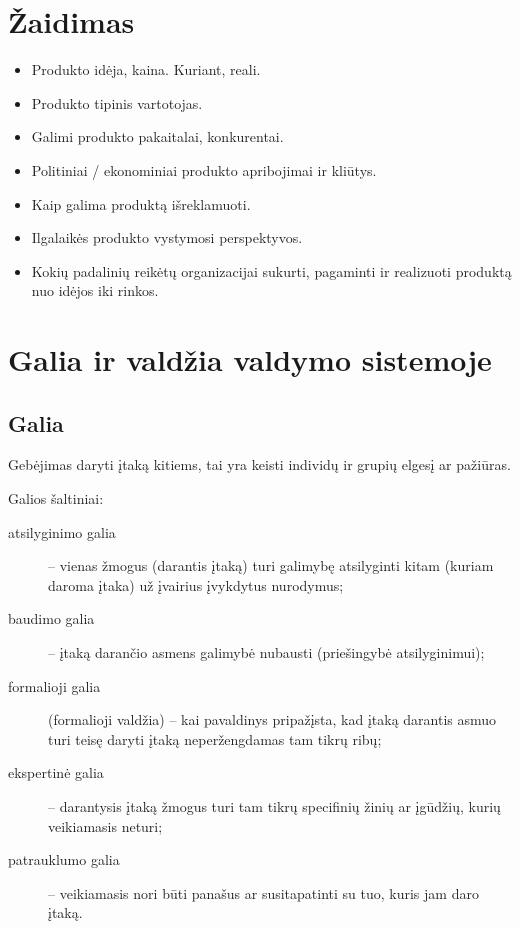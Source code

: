 \chapter{Žaidimas}

\begin{itemize}
  \item Produkto idėja, kaina. Kuriant, reali.
  \item Produkto tipinis vartotojas.
  \item Galimi produkto pakaitalai, konkurentai.
  \item Politiniai / ekonominiai produkto apribojimai ir kliūtys.
  \item Kaip galima produktą išreklamuoti.
  \item Ilgalaikės produkto vystymosi perspektyvos.
  \item Kokių padalinių reikėtų organizacijai sukurti, pagaminti ir 
    realizuoti produktą nuo idėjos iki rinkos.
\end{itemize}

\chapter{Galia ir valdžia valdymo sistemoje}

\section{Galia}

\begin{defn}[Galia]
  Gebėjimas daryti įtaką kitiems, tai yra keisti individų ir grupių
  elgesį ar pažiūras.
\end{defn}

Galios šaltiniai:
\begin{description}
  \item[atsilyginimo galia] – vienas žmogus (darantis įtaką) turi
    galimybę atsilyginti kitam (kuriam daroma įtaka) už įvairius
    įvykdytus nurodymus;
  \item[baudimo galia] – įtaką darančio asmens galimybė nubausti
    (priešingybė atsilyginimui);
  \item[formalioji galia] (formalioji valdžia) – kai pavaldinys
    pripažįsta, kad įtaką darantis asmuo turi teisę daryti įtaką
    neperžengdamas tam tikrų ribų;
  \item[ekspertinė galia] – darantysis įtaką žmogus turi tam tikrų
    specifinių žinių ar įgūdžių, kurių veikiamasis neturi;
  \item[patrauklumo galia] – veikiamasis nori būti panašus ar
    susitapatinti su tuo, kuris jam daro įtaką.
\end{description}

